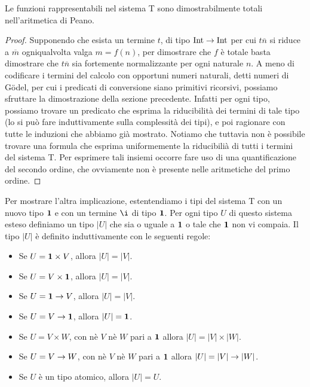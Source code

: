 \documentclass[]{marticle}
\begin{document}
\begin{block}[Proposizione]
    Le funzioni rappresentabili nel sistema T sono dimostrabilmente totali
    nell'aritmetica di Peano.
\end{block}
\begin{proof}
    Supponendo che esista un termine $t$, di tipo $\text{Int}\rightarrow\text{Int}$ per cui
    $t\overline{n}$ si riduce a $\overline{m}$ ogniqualvolta valga $m = f(n)$,
    per dimostrare che $f$ \`e totale basta dimostrare che $t\overline{n}$ sia
    fortemente normalizzante per ogni naturale $n$. A meno di codificare i
    termini del calcolo con opportuni numeri naturali, detti numeri di G\"odel,
    per cui i predicati di conversione siano primitivi ricorsivi, possiamo
    sfruttare la dimostrazione della sezione precedente. Infatti per ogni tipo,
    possiamo trovare un predicato che esprima la riducibilit\`a dei termini di
    tale tipo (lo si pu\`o fare induttivamente sulla complessit\`a dei tipi), e
    poi ragionare con tutte le induzioni che abbiamo gi\`a mostrato. Notiamo che
    tuttavia non \`e possibile trovare una formula che esprima uniformemente la
    riducibili\`a di tutti i termini del sistema T. Per esprimere tali insiemi
    occorre fare uso di una quantificazione del secondo ordine, che ovviamente
    non \`e presente nelle aritmetiche del primo ordine.
\end{proof}

Per mostrare l'altra implicazione, estentendiamo i tipi del sistema T con un
nuovo tipo $\text{\textbf{1}}$ e con un termine $\i$ di tipo $\text{\textbf{1}}$. Per ogni tipo $U$ di
questo sistema esteso definiamo un tipo $|U|$ che sia o uguale a $\text{\textbf{1}}$ o tale
che $\text{\textbf{1}}$ non vi compaia. Il tipo $|U|$ \`e definito induttivamente con le
seguenti regole:
\begin{itemize}
    \item Se $U= \text{\textbf{1}} \times V$, allora $|U|=|V|$.
    \item Se $U= V \times \text{\textbf{1}}$, allora $|U|=|V|$.
    \item Se $U= \text{\textbf{1}} \rightarrow V$, allora $|U|=|V|$.
    \item Se $U= V \rightarrow \text{\textbf{1}}$, allora $|U|=\text{\textbf{1}}$.
    \item Se $U=V\times W$, con n\`e $V$ n\`e $W$ pari a $\text{\textbf{1}}$ allora $|U|=|V|
        \times |W|$.
    \item Se $U=V\rightarrow W$, con n\`e $V$ n\`e $W$ pari a $\text{\textbf{1}}$ allora $|U|=|V|
        \rightarrow |W|$.
    \item Se $U$ \`e un tipo atomico, allora $|U|=U$.
\end{itemize}
\end{document}
